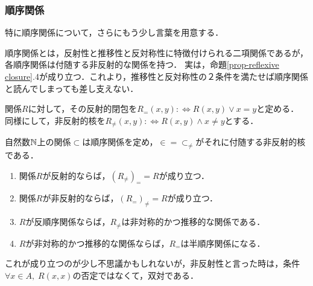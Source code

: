 \documentclass[uplatex, 12pt, dvipdfmx]{jsreport}
\begin{document}
\subsubsection*{順序関係}

特に順序関係について，さらにもう少し言葉を用意する．

順序関係とは，反射性と推移性と反対称性に特徴付けられる二項関係であるが，各順序関係は付随する非反射的な関係を持つ．
実は，命題\ref{prop-reflexive closure}.4が成り立つ．これより，推移性と反対称性の２条件を満たせば順序関係と読んでしまっても差し支えない．
\begin{notation}
    関係$R$に対して，その反射的閉包を$R_=(x,y):\Leftrightarrow R(x,y)\lor x=y$と定める．
    同様にして，非反射的核を$R_\ne(x,y):\Leftrightarrow R(x,y)\land x\ne y$とする．
\end{notation}
\begin{example}
    自然数$\mathbb{N}$上の関係$\subset$は順序関係を定め，$\in=\subset_\ne$がそれに付随する非反射的核である．
\end{example}

\begin{proposition}\label{prop-reflexive closure}\mbox{}
    \begin{enumerate}
        \item 関係$R$が反射的ならば，$(R_\ne)_==R$が成り立つ．
        \item 関係$R$が非反射的ならば，$(R_=)_{\ne}=R$が成り立つ．
        \item $R$が反順序関係ならば，$R_{\ne}$は非対称的かつ推移的な関係である．
        \item $R$が非対称的かつ推移的な関係ならば，$R_=$は半順序関係になる．
    \end{enumerate}
\end{proposition}
\begin{remark}
    これが成り立つのが少し不思議かもしれないが，非反射性と言った時は，条件$\forall x\in A,\; R(x,x)$の否定ではなくて，双対である．
\end{remark}
\end{document}
